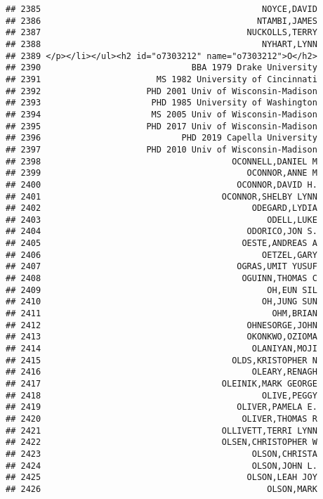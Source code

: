 \documentclass[
]{article}
\begin{document}
\begin{verbatim}
## 2385                                            NOYCE,DAVID
## 2386                                           NTAMBI,JAMES
## 2387                                         NUCKOLLS,TERRY
## 2388                                            NYHART,LYNN
## 2389 </p></li></ul><h2 id="o7303212" name="o7303212">O</h2>
## 2390                              BBA 1979 Drake University
## 2391                       MS 1982 University of Cincinnati
## 2392                     PHD 2001 Univ of Wisconsin-Madison
## 2393                      PHD 1985 University of Washington
## 2394                      MS 2005 Univ of Wisconsin-Madison
## 2395                     PHD 2017 Univ of Wisconsin-Madison
## 2396                            PHD 2019 Capella University
## 2397                     PHD 2010 Univ of Wisconsin-Madison
## 2398                                      OCONNELL,DANIEL M
## 2399                                         OCONNOR,ANNE M
## 2400                                       OCONNOR,DAVID H.
## 2401                                    OCONNOR,SHELBY LYNN
## 2402                                          ODEGARD,LYDIA
## 2403                                             ODELL,LUKE
## 2404                                         ODORICO,JON S.
## 2405                                        OESTE,ANDREAS A
## 2406                                            OETZEL,GARY
## 2407                                       OGRAS,UMIT YUSUF
## 2408                                        OGUINN,THOMAS C
## 2409                                             OH,EUN SIL
## 2410                                            OH,JUNG SUN
## 2411                                              OHM,BRIAN
## 2412                                         OHNESORGE,JOHN
## 2413                                         OKONKWO,OZIOMA
## 2414                                          OLANIYAN,MOJI
## 2415                                      OLDS,KRISTOPHER N
## 2416                                          OLEARY,RENAGH
## 2417                                    OLEINIK,MARK GEORGE
## 2418                                            OLIVE,PEGGY
## 2419                                       OLIVER,PAMELA E.
## 2420                                        OLIVER,THOMAS R
## 2421                                    OLLIVETT,TERRI LYNN
## 2422                                    OLSEN,CHRISTOPHER W
## 2423                                          OLSON,CHRISTA
## 2424                                          OLSON,JOHN L.
## 2425                                         OLSON,LEAH JOY
## 2426                                             OLSON,MARK

\end{verbatim}
\end{document}
